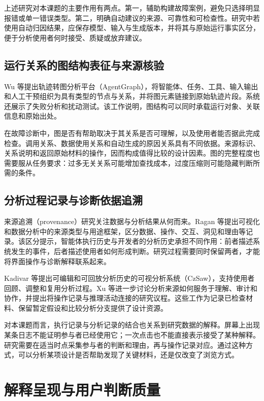上述研究对本课题的主要作用有两点。第一，辅助构建故障案例，避免只选择明显报错或单一错误类型。第二，明确自动建议的来源、可靠性和可检查性。研究中若使用自动归因结果，应保存模型、输入与生成版本，并将其与原始运行事实区分，便于分析使用者何时接受、质疑或放弃建议。

\subsection{运行关系的图结构表征与来源核验}

Wu 等\cite{ref23}提出轨迹转图分析平台（AgentGraph），将智能体、任务、工具、输入输出和人工干预组织为具有类型的节点与关系，并将图元素链接到原始轨迹片段。系统还展示了失败分析和扰动测试。该工作说明，图结构可以同时承载运行对象、关联信息和原始出处。

在故障诊断中，图是否有帮助取决于其关系是否可理解，以及使用者能否据此完成检查。调用关系、数据使用关系和自动生成的原因关系具有不同依据。来源标识、关系说明和返回原始材料的操作，因而构成值得比较的设计因素。图的完整程度也需要服从任务要求：过多无关关系可能增加查找成本，过度压缩则可能隐藏判断所需的条件。

\subsection{分析过程记录与诊断依据追溯}

来源追溯（provenance）研究关注数据与分析结果从何而来。Ragan 等\cite{ref36}提出可视化和数据分析中的来源类型与用途框架，区分数据、操作、交互、洞见和理由等记录。该区分提示，智能体执行历史与开发者的分析历史承担不同作用：前者描述系统发生的事件，后者描述使用者如何形成判断。研究过程需要同时保留两者，才能将界面操作与诊断解释联系起来。

Kadivar 等\cite{ref38}提出可编辑和可回放分析历史的可视分析系统（CzSaw），支持使用者回顾、调整和复用分析过程。Xu 等\cite{ref37}进一步讨论分析来源如何服务于理解、审计和协作，并提出将操作记录与推理活动连接的研究议程。这些工作为记录已检查材料、保留暂定假设和比较分析分支提供了设计资源。

对本课题而言，执行记录与分析记录的结合也关系到研究数据的解释。屏幕上出现某条日志不能证明参与者已经使用它；一次点击也不能直接表示接受了某种解释。研究需要在适当时点采集参与者的判断和理由，再与操作记录对应。通过这种方式，可以分析某项设计是否帮助发现了关键材料，还是仅改变了浏览方式。

\section{解释呈现与用户判断质量}

